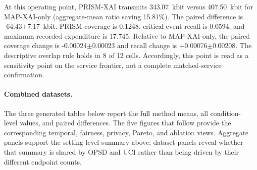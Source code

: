 At this operating point, PRISM-XAI transmits 343.07~kbit versus 407.50~kbit for MAP-XAI-only (aggregate-mean ratio saving 15.81\%). The paired difference is -64.43$\pm$7.17~kbit. PRISM coverage is 0.1248, critical-event recall is 0.0594, and maximum recorded expenditure is 17.745. Relative to MAP-XAI-only, the paired coverage change is -0.00024$\pm$0.00023 and recall change is +0.00076$\pm$0.00208. The descriptive overlap rule holds in 8 of 12 cells. Accordingly, this point is read as a sensitivity point on the service frontier, not a complete matched-service confirmation.

\paragraph{Combined datasets.} The three generated tables below report the full method means, all condition-level values, and paired differences. The five figures that follow provide the corresponding temporal, fairness, privacy, Pareto, and ablation views. Aggregate panels support the setting-level summary above; dataset panels reveal whether that summary is shared by OPSD and UCI rather than being driven by their different endpoint counts.

\begin{table}[p]\centering\tiny

\caption{Public-score threshold $\tau=2$, release cap $M=16$, Combined datasets: complete generated method table.}

\label{tab:thr_2_cap_16:combined:main}

\resizebox{\linewidth}{!}{}

\end{table}\clearpage

\begin{table}[p]\centering\tiny

\caption{Public-score threshold $\tau=2$, release cap $M=16$, Combined datasets: complete condition-level generated table.}

\label{tab:thr_2_cap_16:combined:conditions}

\resizebox{\textwidth}{!}{}

\end{table}\clearpage

\begin{table}[p]\centering\tiny

\caption{Public-score threshold $\tau=2$, release cap $M=16$, Combined datasets: complete generated paired comparisons.}

\label{tab:thr_2_cap_16:combined:paired}

\resizebox{\textwidth}{!}{}

\end{table}\clearpage

